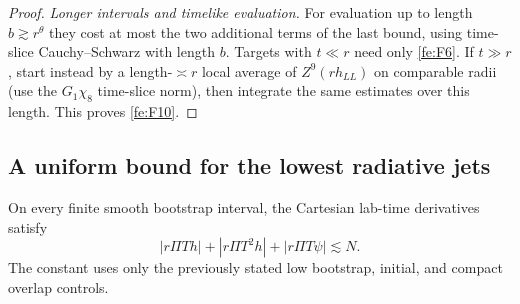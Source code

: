 \begin{proof}
\emph{Longer intervals and timelike evaluation.}
For evaluation up to length \(b\gtrsim r^\theta\) they cost at most the two additional terms of the last bound, using time-slice Cauchy--Schwarz with length \(b\). Targets with \(t\ll r\) need only \eqref{fe:F6}. If \(t\gg r\), start instead by a length-\(\asymp r\) local average of \(Z^9(rh_{LL})\) on comparable radii (use the \(G_1\chi_8\) time-slice norm), then integrate the same estimates over this length. This proves \eqref{fe:F10}.
\end{proof}

\subsection{A uniform bound for the lowest radiative jets}\label{fe:news}

\begin{lemma}
On every finite smooth bootstrap interval, the Cartesian lab-time derivatives satisfy
\begin{equation}\label{fe:F11}
 |r\Pi T h|+|r\Pi T^2h|+|r\Pi T\psi|\lesssim N.
\end{equation}
The constant uses only the previously stated low bootstrap, initial, and compact overlap controls.
\end{lemma}

